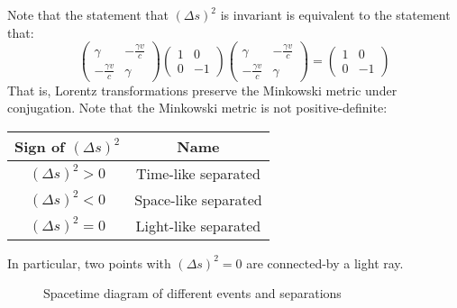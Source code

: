 \documentclass[../Main.tex]{subfiles}
\begin{document}
Note that the statement that $(\Delta s)^2$ is invariant is equivalent to the statement that:
\begin{equation}
    \begin{pmatrix}\gamma & -\frac{\gamma v}{c} \\ -\frac{\gamma v}{c} & \gamma\end{pmatrix} \begin{pmatrix} 1 & 0 \\ 0 & -1\end{pmatrix}\begin{pmatrix}\gamma & -\frac{\gamma v}{c} \\ -\frac{\gamma v}{c} & \gamma\end{pmatrix} = \begin{pmatrix}1 & 0 \\ 0 & -1\end{pmatrix}
    \label{eqnLorentzPreserveMinkowski}
\end{equation}
That is, Lorentz transformations preserve the Minkowski metric under conjugation. Note that the Minkowski metric is not positive-definite: 

\begin{tabular}{c|c}
    Sign of $(\Delta s)^2$ & Name \\
    \hline
    $(\Delta s)^2 > 0$ & Time-like separated \\
    $(\Delta s)^2 < 0$ & Space-like separated \\
    $(\Delta s)^2 = 0$ & Light-like separated \\
\end{tabular}

In particular, two points with $(\Delta s)^2 = 0$ are connected-by a light ray.
\begin{figure}[ht]
    \centering
    \caption{Spacetime diagram of different events and separations}
    \label{figSpaceTimeSeparations}
\end{figure}
\end{document}
